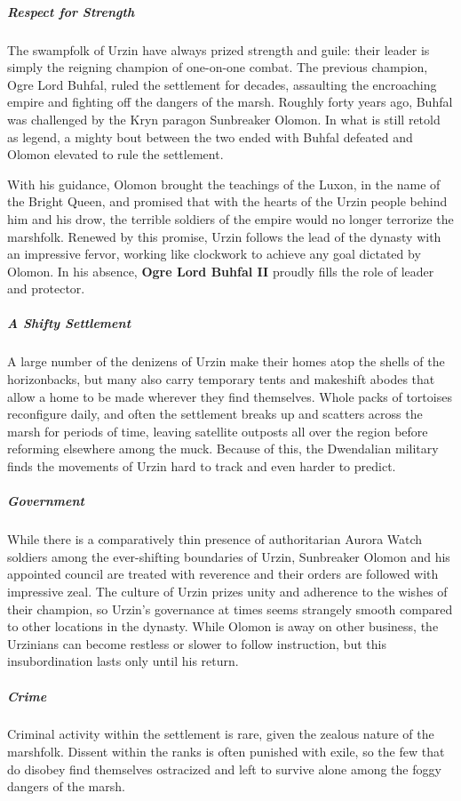 \documentclass[10pt,a4paper,twoside,bg=print,twocolumn,openany,nodeprecatedcode]{dndbook}
\begin{document}
\subparagraph{Respect for Strength}
The swampfolk of Urzin have always prized strength and guile: their leader is simply the reigning champion of one-on-one combat. The previous champion, Ogre Lord Buhfal, ruled the settlement for decades, assaulting the encroaching empire and fighting off the dangers of the marsh. Roughly forty years ago, Buhfal was challenged by the Kryn paragon Sunbreaker Olomon. In what is still retold as legend, a mighty bout between the two ended with Buhfal defeated and Olomon elevated to rule the settlement.

With his guidance, Olomon brought the teachings of the Luxon, in the name of the Bright Queen, and promised that with the hearts of the Urzin people behind him and his drow, the terrible soldiers of the empire would no longer terrorize the marshfolk. Renewed by this promise, Urzin follows the lead of the dynasty with an impressive fervor, working like clockwork to achieve any goal dictated by Olomon. In his absence, \textbf{Ogre Lord Buhfal II} proudly fills the role of leader and protector.

\subparagraph{A Shifty Settlement}
A large number of the denizens of Urzin make their homes atop the shells of the horizonbacks, but many also carry temporary tents and makeshift abodes that allow a home to be made wherever they find themselves. Whole packs of tortoises reconfigure daily, and often the settlement breaks up and scatters across the marsh for periods of time, leaving satellite outposts all over the region before reforming elsewhere among the muck. Because of this, the Dwendalian military finds the movements of Urzin hard to track and even harder to predict.

\subparagraph{Government}
While there is a comparatively thin presence of authoritarian Aurora Watch soldiers among the ever-shifting boundaries of Urzin, Sunbreaker Olomon and his appointed council are treated with reverence and their orders are followed with impressive zeal. The culture of Urzin prizes unity and adherence to the wishes of their champion, so Urzin's governance at times seems strangely smooth compared to other locations in the dynasty. While Olomon is away on other business, the Urzinians can become restless or slower to follow instruction, but this insubordination lasts only until his return.

\subparagraph{Crime}
Criminal activity within the settlement is rare, given the zealous nature of the marshfolk. Dissent within the ranks is often punished with exile, so the few that do disobey find themselves ostracized and left to survive alone among the foggy dangers of the marsh.
\end{document}
